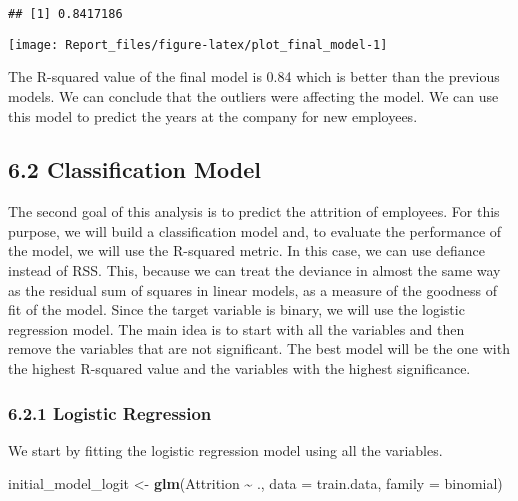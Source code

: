 \documentclass[
]{article}
\newenvironment{Shaded}{\begin{snugshade}}{\end{snugshade}}
\newcommand{\AttributeTok}[1]{\textcolor[rgb]{0.13,0.29,0.53}{#1}}
\newcommand{\FunctionTok}[1]{\textcolor[rgb]{0.13,0.29,0.53}{\textbf{#1}}}
\newcommand{\NormalTok}[1]{#1}
\newcommand{\OtherTok}[1]{\textcolor[rgb]{0.56,0.35,0.01}{#1}}
\newcommand{\SpecialCharTok}[1]{\textcolor[rgb]{0.81,0.36,0.00}{\textbf{#1}}}
\begin{document}
\begin{verbatim}
## [1] 0.8417186
\end{verbatim}

\begin{center}\texttt{[image: Report\_files/figure-latex/plot\_final\_model-1]} \end{center}

The R-squared value of the final model is 0.84 which is better than the
previous models. We can conclude that the outliers were affecting the
model. We can use this model to predict the years at the company for new
employees.

\hypertarget{classification-model}{%
\subsection{6.2 Classification Model}\label{classification-model}}

The second goal of this analysis is to predict the attrition of
employees. For this purpose, we will build a classification model and,
to evaluate the performance of the model, we will use the R-squared
metric. In this case, we can use defiance instead of RSS. This, because
we can treat the deviance in almost the same way as the residual sum of
squares in linear models, as a measure of the goodness of fit of the
model. Since the target variable is binary, we will use the logistic
regression model. The main idea is to start with all the variables and
then remove the variables that are not significant. The best model will
be the one with the highest R-squared value and the variables with the
highest significance.

\hypertarget{logistic-regression}{%
\subsubsection{6.2.1 Logistic Regression}\label{logistic-regression}}

We start by fitting the logistic regression model using all the
variables.

\begin{Shaded}
\begin{Highlighting}[]
\NormalTok{initial\_model\_logit }\OtherTok{\textless{}{-}} \FunctionTok{glm}\NormalTok{(Attrition }\SpecialCharTok{\textasciitilde{}}\NormalTok{ ., }\AttributeTok{data =}\NormalTok{ train.data, }\AttributeTok{family =}\NormalTok{ binomial)}
\end{Highlighting}
\end{Shaded}
\end{document}
